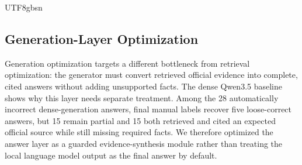 \documentclass{article}
\begin{document}
\begin{CJK*}{UTF8}{gbsn}
\subsection{Generation-Layer Optimization}
\label{sec:generation-optimization}

Generation optimization targets a different bottleneck from retrieval optimization: the generator must convert retrieved official evidence into complete, cited answers without adding unsupported facts. The dense Qwen3.5 baseline shows why this layer needs separate treatment. Among the 28 automatically incorrect dense-generation answers, final manual labels recover five loose-correct answers, but 15 remain partial and 15 both retrieved and cited an expected official source while still missing required facts. We therefore optimized the answer layer as a guarded evidence-synthesis module rather than treating the local language model output as the final answer by default.


\end{CJK*}
\end{document}
